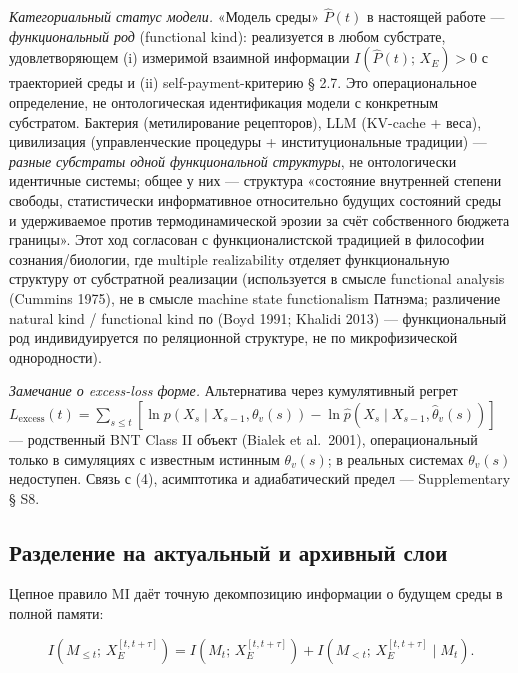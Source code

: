 \documentclass[pdflatex,sn-mathphys-ay]{sn-jnl}
\providecommand{\lt}{<}\providecommand{\gt}{>}
\begin{document}
\emph{Категориальный статус модели.} «Модель среды» \(\hat P(t)\) в настоящей работе --- \emph{функциональный род} (functional kind): реализуется в любом субстрате, удовлетворяющем (i) измеримой взаимной информации \(I(\hat P(t);\, X_E) > 0\) с траекторией среды и (ii) self-payment-критерию § 2.7. Это операциональное определение, не онтологическая идентификация модели с конкретным субстратом. Бактерия (метилирование рецепторов), LLM (KV-cache + веса), цивилизация (управленческие процедуры + институциональные традиции) --- \emph{разные субстраты одной функциональной структуры}, не онтологически идентичные системы; общее у них --- структура «состояние внутренней степени свободы, статистически информативное относительно будущих состояний среды и удерживаемое против термодинамической эрозии за счёт собственного бюджета границы». Этот ход согласован с функционалистской традицией в философии сознания/биологии, где multiple realizability отделяет функциональную структуру от субстратной реализации (используется в смысле functional analysis (Cummins 1975), не в смысле machine state functionalism Патнэма; различение natural kind / functional kind по (Boyd 1991; Khalidi 2013) --- функциональный род индивидуируется по реляционной структуре, не по микрофизической однородности).



\emph{Замечание о excess-loss форме.} Альтернатива через кумулятивный регрет \(L_{\text{excess}}(t) = \sum_{s\le t} [\ln p(X_s\mid X_{s-1},\theta_v(s)) - \ln \hat p(X_s\mid X_{s-1},\hat\theta_v(s))]\) --- родственный BNT Class II объект (Bialek et al.~2001), операциональный только в симуляциях с известным истинным \(\theta_v(s)\); в реальных системах \(\theta_v(s)\) недоступен. Связь с (4), асимптотика и адиабатический предел --- Supplementary § S8.



\subsection{Разделение на актуальный и архивный слои}\label{ux440ux430ux437ux434ux435ux43bux435ux43dux438ux435-ux43dux430-ux430ux43aux442ux443ux430ux43bux44cux43dux44bux439-ux438-ux430ux440ux445ux438ux432ux43dux44bux439-ux441ux43bux43eux438}



Цепное правило MI даёт точную декомпозицию информации о будущем среды в полной памяти:



\begin{equation}I\!\left(M_{\le t};\, X_E^{[t, t+\tau]}\right) = I\!\left(M_t;\, X_E^{[t, t+\tau]}\right) + I\!\left(M_{\lt t};\, X_E^{[t, t+\tau]} \mid M_t\right). \tag{5}\end{equation}
\end{document}
